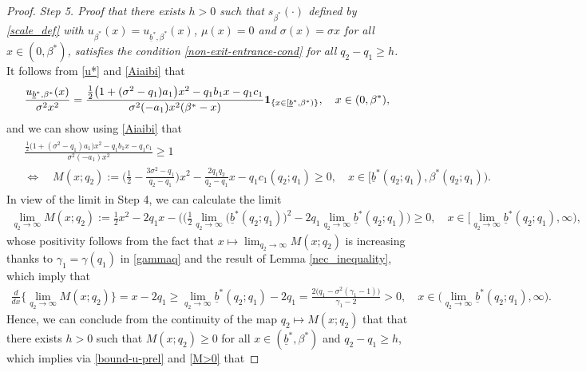 \documentclass[11pt]{article} %
\def\ub{\underline{b}}
\numberwithin{komcounter}{section}
\begin{document}
\begin{proof}
\vspace{1mm}
{\it Step 5. Proof that there exists $h>0$ such that $s_{\beta^*}(\cdot)$ defined by \eqref{scale_def} with $u_{\beta^*}(x) = u_{\ub^*,\beta^*}(x)$, $\mu(x)=0$ and $\sigma(x) = \sigma x$ for all $x \in (0,\beta^*)$, satisfies the condition \eqref{non-exit-entrance-cond} for all $q_2-q_1\geq h$.}
It follows from \eqref{u*} and \eqref{Aiaibi} that
\begin{equation} \label{bound-u-prel}
\frac{u_{\ub^*,\beta^*}(x)}{\sigma^2 x^2} 
= \frac{\tfrac12 \big(1 + (\sigma^2 - q_1) a_1 \big) x^2 - q_1 b_1 x - q_1 c_1}{\sigma^2 (-a_1) x^2 (\beta^* - x)} {\bf 1}_{\{x \in [\ub^*,\beta^*)\}}, \quad x \in (0,\beta^*) ,
\end{equation}
and we can show using \eqref{Aiaibi} that 
\begin{align} \label{M>0}
\begin{split}
&\frac{\tfrac12 \big(1 + (\sigma^2 - q_1) a_1 \big) x^2 - q_1 b_1 x - q_1 c_1}{\sigma^2 (-a_1) x^2} \geq 1 \\
&\Leftrightarrow \quad M(x;q_2) := \Big(\frac12 - \frac{3\sigma^2 - q_1}{q_2-q_1} \Big) x^2 - \frac{2 q_1 q_2}{q_2-q_1} x - q_1 c_1(q_2;q_1) \geq 0 , \quad x \in \big[\ub^*(q_2;q_1),\beta^*(q_2;q_1) \big).
\end{split}
\end{align} 
In view of the limit in Step 4, we can calculate the limit 
\begin{align*} 
\lim_{q_2 \to \infty}M(x;q_2) := \tfrac12 x^2 - 2 q_1 x - \big((\tfrac12 \lim_{q_2 \to \infty} \big(\ub^*(q_2;q_1)\big)^2 - 2 q_1 \lim_{q_2 \to \infty} \ub^*(q_2;q_1) \big) \geq 0 , \quad x \in \big[\lim_{q_2 \to \infty}\ub^*(q_2;q_1), \infty \big) ,
\end{align*}
whose positivity follows from the fact that $x \mapsto \lim_{q_2 \to \infty}M(x;q_2)$ is increasing thanks to $\gamma_1 = \gamma(q_1)$ in \eqref{gammaq} and the result of Lemma \ref{nec_inequality}, which imply that  
\begin{align*} 
\frac{d}{dx} \Big\{\lim_{q_2 \to \infty}M(x;q_2) \Big\} 
= x - 2 q_1 
\geq \lim_{q_2 \to \infty}\ub^*(q_2;q_1) - 2 q_1
= \frac{2 \big(q_1 - \sigma^2(\gamma_1 - 1)\big)}{\gamma_1 - 2} > 0, 
\quad x \in \big(\lim_{q_2 \to \infty}\ub^*(q_2;q_1), \infty \big) .
\end{align*}
Hence, we can conclude from the continuity of the map $q_2 \mapsto M(x;q_2)$ that that there exists $h>0$ such that $M(x;q_2) \geq 0$ for all $x \in (\ub^*,\beta^*)$ and $q_2-q_1\geq h$, which implies via \eqref{bound-u-prel} and \eqref{M>0} that

\end{proof}
\end{document}
